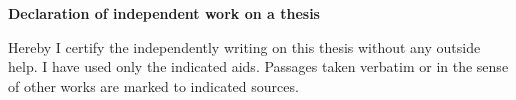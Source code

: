 \clearpage
\thispagestyle{plain}
\ITocEntryStatementEN
\textbf{\sffamily\large Declaration of independent work on a thesis}

Hereby I certify the independently writing on this thesis without any outside help. I have used only the indicated aids.
Passages taken verbatim or in the sense of other works are marked to indicated sources.

\vspace{1cm}
\noindent\makebox[3cm]{\hrulefill} \hspace{0.1cm}
    \makebox[3cm]{\hrulefill} \hspace{0.1cm}
    \makebox[6cm]{\hrulefill} \\
\noindent{} \hspace{0.1cm}
     \hspace{0.1cm}

\clearpage
